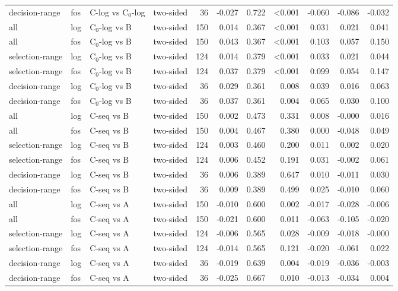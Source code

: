 \begin{longtable}{llllrrrrrrr}
decision-range & fos & C-log vs C$_0$-log & two-sided & 36 & -0.027 & 0.722 & <0.001 & -0.060 & -0.086 & -0.032 \\
all & log & C$_0$-log vs B & two-sided & 150 & 0.014 & 0.367 & <0.001 & 0.031 & 0.021 & 0.041 \\
all & fos & C$_0$-log vs B & two-sided & 150 & 0.043 & 0.367 & <0.001 & 0.103 & 0.057 & 0.150 \\
selection-range & log & C$_0$-log vs B & two-sided & 124 & 0.014 & 0.379 & <0.001 & 0.033 & 0.021 & 0.044 \\
selection-range & fos & C$_0$-log vs B & two-sided & 124 & 0.037 & 0.379 & <0.001 & 0.099 & 0.054 & 0.147 \\
decision-range & log & C$_0$-log vs B & two-sided & 36 & 0.029 & 0.361 & 0.008 & 0.039 & 0.016 & 0.063 \\
decision-range & fos & C$_0$-log vs B & two-sided & 36 & 0.037 & 0.361 & 0.004 & 0.065 & 0.030 & 0.100 \\
all & log & C-seq vs B & two-sided & 150 & 0.002 & 0.473 & 0.331 & 0.008 & -0.000 & 0.016 \\
all & fos & C-seq vs B & two-sided & 150 & 0.004 & 0.467 & 0.380 & 0.000 & -0.048 & 0.049 \\
selection-range & log & C-seq vs B & two-sided & 124 & 0.003 & 0.460 & 0.200 & 0.011 & 0.002 & 0.020 \\
selection-range & fos & C-seq vs B & two-sided & 124 & 0.006 & 0.452 & 0.191 & 0.031 & -0.002 & 0.061 \\
decision-range & log & C-seq vs B & two-sided & 36 & 0.006 & 0.389 & 0.647 & 0.010 & -0.011 & 0.030 \\
decision-range & fos & C-seq vs B & two-sided & 36 & 0.009 & 0.389 & 0.499 & 0.025 & -0.010 & 0.060 \\
all & log & C-seq vs A & two-sided & 150 & -0.010 & 0.600 & 0.002 & -0.017 & -0.028 & -0.006 \\
all & fos & C-seq vs A & two-sided & 150 & -0.021 & 0.600 & 0.011 & -0.063 & -0.105 & -0.020 \\
selection-range & log & C-seq vs A & two-sided & 124 & -0.006 & 0.565 & 0.028 & -0.009 & -0.018 & -0.000 \\
selection-range & fos & C-seq vs A & two-sided & 124 & -0.014 & 0.565 & 0.121 & -0.020 & -0.061 & 0.022 \\
decision-range & log & C-seq vs A & two-sided & 36 & -0.019 & 0.639 & 0.004 & -0.019 & -0.036 & -0.003 \\
decision-range & fos & C-seq vs A & two-sided & 36 & -0.025 & 0.667 & 0.010 & -0.013 & -0.034 & 0.004 \\

\end{longtable}
